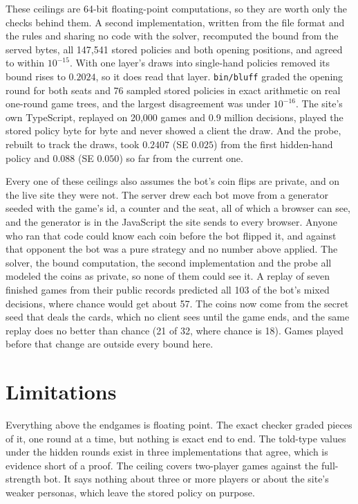 \documentclass[11pt]{article}
\newcommand{\code}[1]{\texttt{\small #1}}
\newcommand{\servedprobe}{0.088}       %
\newcommand{\servedprobese}{0.050}
\begin{document}
These ceilings are 64-bit floating-point computations, so they are worth only the checks behind
them. A second implementation, written from the file format and the rules and sharing no code with
the solver, recomputed the bound from the served bytes, all 147,541 stored policies and both
opening positions, and agreed to within $10^{-15}$. With one layer's draws
into single-hand policies removed its bound rises to $0.2024$, so it does read that layer. \code{bin/bluff} graded the opening
round for both seats and 76 sampled stored policies in exact arithmetic on real one-round game
trees, and the largest disagreement was under $10^{-16}$. The site's
own TypeScript, replayed on 20,000 games and 0.9 million decisions, played the stored policy byte
for byte and never showed a client the draw. And the probe, rebuilt to track the draws, took
$0.2407$ (SE $0.025$) from the first hidden-hand policy and $\servedprobe$ (SE $\servedprobese$) so far from
the current one.

Every one of these ceilings also assumes the bot's coin flips are private, and on the live site
they were not. The server drew each bot move from a generator seeded with the game's id, a counter
and the seat, all of which a browser can see, and the generator is in the JavaScript the site sends to every browser. Anyone who ran that code could know
each coin before the bot flipped it, and against that opponent the bot was a pure strategy and no
number above applied. The solver, the bound computation, the second implementation and the probe all modeled
the coins as private, so none of them could see it. A replay of seven finished games from their
public records predicted all 103 of the bot's mixed decisions, where chance would get about
57. The coins now come from the secret seed that deals the cards, which no client sees until the
game ends, and the same replay does no better than chance (21 of 32, where chance is 18). Games
played before that change are outside every bound here.

\section{Limitations}

Everything above the endgames is floating point. The exact checker graded pieces of it, one round
at a time, but nothing is exact end to end. The told-type values under the hidden rounds exist in
three implementations that agree, which is evidence short of a proof. The ceiling covers
two-player games against the full-strength bot. It says nothing about three or more players or
about the site's weaker personas, which leave the stored policy on purpose.
\end{document}
